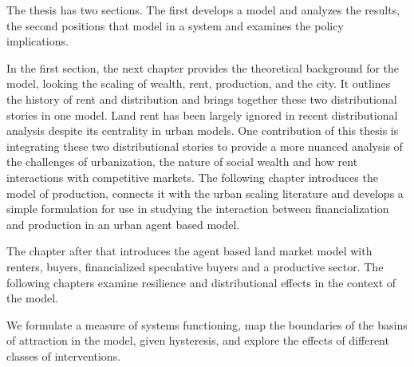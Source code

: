 The thesis has two sections. The first develops a model and analyzes the results, the second positions that model in a system and examines the policy implications.

In the first section,
the next chapter provides the theoretical background for the model, looking the scaling of wealth, rent, production, and the city. 
It outlines the history of rent and distribution and brings together these two distributional stories in one model. Land rent has been largely ignored in recent distributional analysis despite its centrality in urban models. One contribution of this thesis is integrating these two distributional stories to provide a more nuanced analysis of the challenges of urbanization, the nature of social wealth and how rent interactions with competitive markets. %
The following chapter introduces the model of production, connects it with the urban scaling literature and develops a simple formulation for use in studying the interaction between financialization and production in an urban agent based model.


The chapter after that introduces the agent based land market model with renters, buyers, financialized speculative buyers and a productive sector. 
The following chapters examine resilience and distributional effects in the context of the model. 


We formulate a measure of systems functioning, map the boundaries of the basins of attraction in the model, given hysteresis, and explore the effects of different classes of interventions. %

